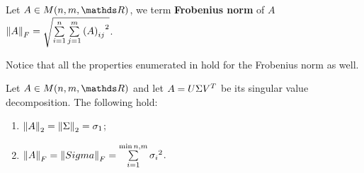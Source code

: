 \documentclass[ComputationalMathematics.tex]{subfiles}
\begin{document}
\begin{definition}
  Let $A \in M(n, m, \R)$, we term \textbf{Frobenius norm} of $A$ ${\left\lVert A\right\rVert}_F = \sqrt{\sum\limits_{i=1}^n \sum\limits_{j=1}^m {{(A)}_{ij}}^2}$.
\end{definition}

Notice that all the properties enumerated in  hold for the Frobenius norm as well.

\begin{proposition}
  Let $A \in M(n, m, \R)$ and let $A = U \Sigma {V}^{T}$ be its singular value decomposition.
  The following hold:
  \begin{enumerate}
    \item $\left\lVert A\right\rVert_2 = \left\lVert\Sigma\right\rVert_2 = \sigma_1$;
    \item $\left\lVert A\right\rVert_F = \left\lVert Sigma\right\rVert_F = \sum\limits_{i=1}^{\min{n, m}} {\sigma_i}^2$.
  \end{enumerate}
\end{proposition}
\end{document}
